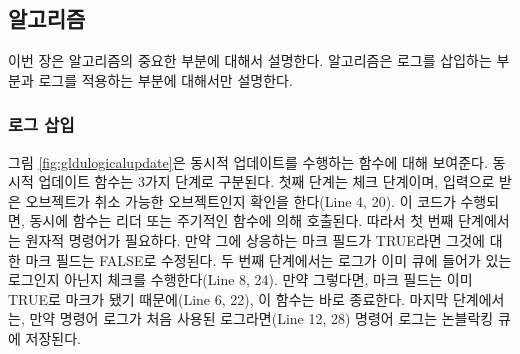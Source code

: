 \subsection{알고리즘}

이번 장은 알고리즘의 중요한 부분에 대해서 설명한다. 
알고리즘은 로그를 삽입하는 부분과 로그를 적용하는 부분에 대해서만 설명한다.

\subsubsection{로그 삽입}
그림 \ref{fig:gldulogicalupdate}은 동시적 업데이트를 수행하는 함수에 대해 보여준다.
동시적 업데이트 함수는 3가지 단계로 구분된다.
첫째 단계는 체크 단계이며, 입력으로 받은 오브젝트가 취소 가능한 오브젝트인지 확인을 한다(Line 4, 20). 
이 코드가 수행되면, 동시에  함수는 리더 또는 주기적인 함수에 의해 호출된다.
따라서 첫 번째 단계에서는 원자적 명령어가 필요하다.
만약 그에 상응하는 마크 필드가 TRUE라면 그것에 대한 마크 필드는 FALSE로 수정된다.
두 번째 단계에서는 로그가 이미 큐에 들어가 있는 로그인지 아닌지 체크를 수행한다(Line 8, 24).
만약 그렇다면, 마크 필드는 이미 TRUE로 마크가 됐기 때문에(Line 6, 22), 이 함수는 
바로 종료한다.
마지막 단계에서는, 만약 명령어 로그가 처음 사용된 로그라면(Line 12, 28)
 명령어 로그는 논블락킹 큐에 저장된다. 

